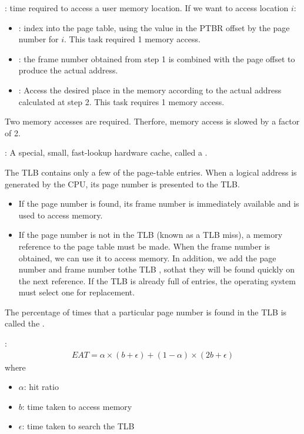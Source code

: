     \par {}:  time required to access a user memory location. If we want to access location $i$:
    \begin{itemize}
      \item {}: index into the page table, using the value in the PTBR offset by the page number for $i$. This task required 1 memory access.
      \item {}: the frame number obtained from step 1 is combined with the page offset to produce the actual address. 
      \item {}: Access the desired place in the memory according to the actual address calculated at step 2. This task requires 1 memory access.
    \end{itemize}
    \par Two memory accesses are required. Therfore, memory access is slowed by a factor of 2.
    \par {}: A special, small, fast-lookup hardware cache, called a .

    \par The TLB contains only a few of the page-table entries. When a logical address is generated by
the CPU, its page number is presented to the TLB.
      \begin{itemize}
        \item If the page number is found, its frame number is immediately available and is used to access memory.
        \item If the page number is not in the TLB (known as a TLB miss), a memory reference to the page table must be made. When the frame number is obtained, we can use it to access memory. In addition, we add the page number and frame number tothe TLB , sothat they will be found quickly on the next reference. If the TLB is already full of entries, the operating system must select one for replacement.
      \end{itemize}


    \par The percentage of times that a particular page number is found in the TLB is called the .
    \par {}:
      \begin{align*}
        EAT = \alpha \times (b + \epsilon) + (1 - \alpha) \times (2b + \epsilon)
      \end{align*}
      where
      \begin{itemize}
        \item $\alpha$: hit ratio
        \item $b$: time taken to access memory
        \item $\epsilon$: time taken to search the TLB
      \end{itemize}

